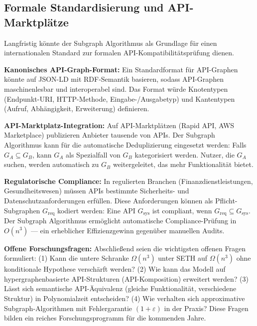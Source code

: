 ﻿\documentclass[a4paper,12pt]{article}
\theoremstyle{definition}
\begin{document}
\subsection{Formale Standardisierung und API-Marktplätze}

Langfristig könnte der Subgraph Algorithmus als Grundlage für einen internationalen
Standard zur formalen API-Kompatibilitätsprüfung dienen.

\textbf{Kanonisches API-Graph-Format:} Ein Standardformat für API-Graphen könnte
auf JSON-LD mit RDF-Semantik basieren, sodass API-Graphen maschinenlesbar und
interoperabel sind. Das Format würde Knotentypen (Endpunkt-URI, HTTP-Methode,
Eingabe-/Ausgabetyp) und Kantentypen (Aufruf, Abhängigkeit, Erweiterung) definieren.

\textbf{API-Marktplatz-Integration:} Auf API-Marktplätzen (Rapid API, AWS Marketplace)
publizieren Anbieter tausende von APIs. Der Subgraph Algorithmus kann für die
automatische Deduplizierung eingesetzt werden: Falls $G_A \subseteq G_B$, kann
$G_A$ als Spezialfall von $G_B$ kategorisiert werden. Nutzer, die $G_A$ suchen,
werden automatisch zu $G_B$ weitergeleitet, das mehr Funktionalität bietet.

\textbf{Regulatorische Compliance:} In regulierten Branchen (Finanzdienstleistungen,
Gesundheitswesen) müssen APIs bestimmte Sicherheits- und Datenschutzanforderungen
erfüllen. Diese Anforderungen können als Pflicht-Subgraphen $G_{\mathrm{req}}$
kodiert werden: Eine API $G_{\mathrm{sys}}$ ist compliant, wenn
$G_{\mathrm{req}} \subseteq G_{\mathrm{sys}}$. Der Subgraph Algorithmus ermöglicht
automatische Compliance-Prüfung in $O(n^3)$ --- ein erheblicher Effizienzgewinn
gegenüber manuellen Audits.

\textbf{Offene Forschungsfragen:} Abschließend seien die wichtigsten offenen Fragen
formuliert: (1) Kann die untere Schranke $\Omega(n^3)$ unter SETH auf $\Omega(n^3)$
ohne konditionale Hypothese verschärft werden? (2) Wie kann das Modell auf
hypergraphenbasierte API-Strukturen (API-Komposition) erweitert werden?
(3) Lässt sich semantische API-Äquivalenz (gleiche Funktionalität, verschiedene
Struktur) in Polynomialzeit entscheiden? (4) Wie verhalten sich approximative
Subgraph-Algorithmen mit Fehlergarantie $(1+\varepsilon)$ in der Praxis?
Diese Fragen bilden ein reiches Forschungsprogramm für die kommenden Jahre.
\end{document}
